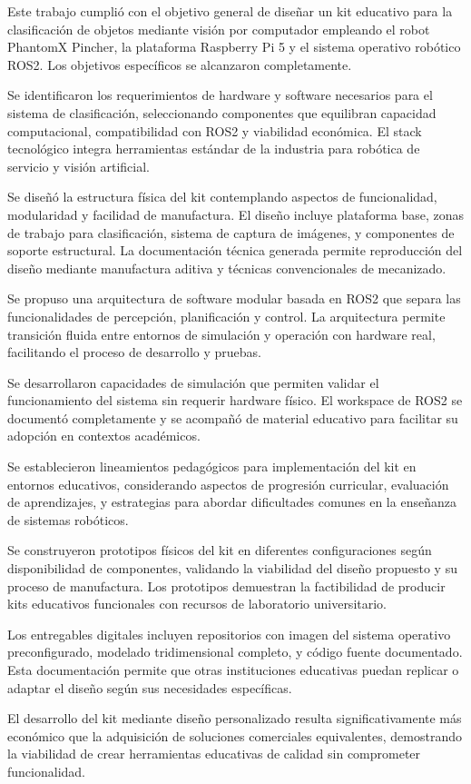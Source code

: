 Este trabajo cumplió con el objetivo general de diseñar un kit educativo para la clasificación de objetos mediante visión por computador empleando el robot PhantomX Pincher, la plataforma Raspberry Pi 5 y el sistema operativo robótico ROS2. Los objetivos específicos se alcanzaron completamente.

Se identificaron los requerimientos de hardware y software necesarios para el sistema de clasificación, seleccionando componentes que equilibran capacidad computacional, compatibilidad con ROS2 y viabilidad económica. El stack tecnológico integra herramientas estándar de la industria para robótica de servicio y visión artificial.

Se diseñó la estructura física del kit contemplando aspectos de funcionalidad, modularidad y facilidad de manufactura. El diseño incluye plataforma base, zonas de trabajo para clasificación, sistema de captura de imágenes, y componentes de soporte estructural. La documentación técnica generada permite reproducción del diseño mediante manufactura aditiva y técnicas convencionales de mecanizado.

Se propuso una arquitectura de software modular basada en ROS2 que separa las funcionalidades de percepción, planificación y control. La arquitectura permite transición fluida entre entornos de simulación y operación con hardware real, facilitando el proceso de desarrollo y pruebas.

Se desarrollaron capacidades de simulación que permiten validar el funcionamiento del sistema sin requerir hardware físico. El workspace de ROS2 se documentó completamente y se acompañó de material educativo para facilitar su adopción en contextos académicos.

Se establecieron lineamientos pedagógicos para implementación del kit en entornos educativos, considerando aspectos de progresión curricular, evaluación de aprendizajes, y estrategias para abordar dificultades comunes en la enseñanza de sistemas robóticos.

Se construyeron prototipos físicos del kit en diferentes configuraciones según disponibilidad de componentes, validando la viabilidad del diseño propuesto y su proceso de manufactura. Los prototipos demuestran la factibilidad de producir kits educativos funcionales con recursos de laboratorio universitario.

Los entregables digitales incluyen repositorios con imagen del sistema operativo preconfigurado, modelado tridimensional completo, y código fuente documentado. Esta documentación permite que otras instituciones educativas puedan replicar o adaptar el diseño según sus necesidades específicas.

El desarrollo del kit mediante diseño personalizado resulta significativamente más económico que la adquisición de soluciones comerciales equivalentes, demostrando la viabilidad de crear herramientas educativas de calidad sin comprometer funcionalidad.